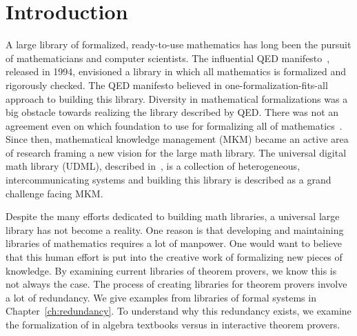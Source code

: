 \chapter{Introduction}
\label{ch:intro}

A large library of formalized, ready-to-use mathematics has long been the pursuit of mathematicians and computer scientists.  
The influential QED manifesto~\citep{boyer1994qed}, released in 1994, envisioned a library in which all mathematics is formalized and rigorously checked. The QED manifesto believed in one-formalization-fits-all approach to building this library.
Diversity in mathematical formalizations was a big obstacle towards realizing the library described by QED. There was not an agreement even on which foundation to use for formalizing all of mathematics~\cite{qedrealoaded2016}.  Since then, mathematical knowledge management (MKM) became an active area of research framing a new vision for the large math library. The universal digital math library (UDML), described in~\cite{farmer2004mkm}, is a collection of heterogeneous, intercommunicating systems and building this library is described as a grand challenge facing MKM. 

Despite the many efforts dedicated to building math libraries, a universal large library has not become a reality. One reason is that developing and maintaining libraries of mathematics requires a lot of manpower. One would want to believe that this human effort is put into the creative work of formalizing new pieces of knowledge. By examining current libraries of theorem provers, we know this is not always the case. The process of creating libraries for theorem provers involve a lot of redundancy. We give examples from libraries of formal systems in Chapter~\ref{ch:redundancy}. To understand why this redundancy exists, we examine the formalization of  in algebra textbooks versus in interactive theorem provers. 

